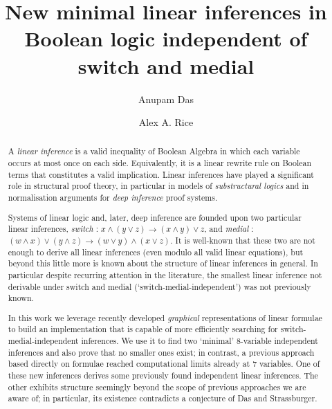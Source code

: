 \documentclass[a4paper, UKenglish, cleveref]{lipics-v2021}
\title{New minimal linear inferences in Boolean logic independent of switch and medial}%
\author{Anupam Das}{University of Birmingham, United Kingdom}{a.das@bham.ac.uk}{https://orcid.org/0000-0002-0142-3676}{}
\author{Alex A. Rice}{University of Cambridge, United Kingdom}{alex.rice@cl.cam.ac.uk}{https://orcid.org/0000-0002-2698-5122}{}
\begin{document}
\maketitle

\begin{abstract}
A \emph{linear inference} is a valid inequality of Boolean Algebra in which each variable occurs at most once on each side.
Equivalently, it is a linear rewrite rule on Boolean terms that constitutes a valid implication.
Linear inferences have played a significant role in structural proof theory, in particular in models of \emph{substructural logics} and in normalisation arguments for \emph{deep inference} proof systems.

Systems of linear logic and, later, deep inference are founded upon two particular linear inferences, \emph{switch} : $x \land (y \lor z) \to (x \land y) \lor z$, and \emph{medial} : $(w \land x) \lor (y \land z) \to (w \lor y) \land (x \lor z)$.
It is well-known that these two are not enough to derive all linear inferences (even modulo all valid linear equations), but
beyond this little more is known about the structure of linear inferences in general.
In particular despite recurring attention in the literature, the smallest linear inference not derivable under switch and medial (`switch-medial-independent') was not previously known.

%
%

In this work we leverage recently developed \emph{graphical} representations of linear formulae to build an implementation that is capable of more efficiently searching for switch-medial-independent inferences. We use it to find two `minimal' 8-variable independent inferences and also prove that no smaller ones exist; in contrast, a previous approach based directly on formulae reached computational limits already at 7 variables. One of these new inferences derives some previously found independent linear inferences. The other exhibits structure seemingly beyond the scope of previous approaches we are aware of; in particular, its existence contradicts a conjecture of Das and Strassburger.
\end{abstract}
\end{document}
